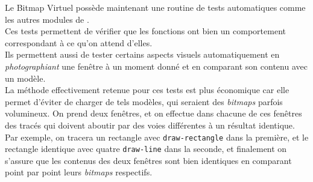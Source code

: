 

Le Bitmap Virtuel poss\`{e}de maintenant une routine de tests automatiques comme
les autres modules de \LeLisp.\\
Ces tests permettent de v\'{e}rifier que les fonctions ont bien un comportement
correspondant \`{a}  ce qu'on attend d'elles.\\
Ils permettent aussi de tester certains aspects visuels automatiquement en
{\em photographiant} une fen\^{e}tre \`{a} un moment donn\'{e} et en comparant son
contenu avec un mod\`{e}le.\\
La m\'{e}thode effectivement retenue pour ces tests est plus \'{e}conomique car elle
permet d'\'{e}viter de charger de tels mod\`{e}les, qui seraient des {\em bitmaps}
parfois volumineux.
On prend deux fen\^{e}tres, et on effectue dans chacune de ces
fen\^{e}tres des trac\'{e}s qui doivent aboutir par des voies diff\'{e}rentes \`{a} un
r\'{e}sultat identique.\\
Par exemple, on tracera un rectangle avec {\tt draw-rectangle} dans la
premi\`{e}re, et le rectangle identique avec quatre {\tt draw-line} dans la
seconde, et finalement on s'assure que les contenus des deux fen\^{e}tres sont
bien identiques en comparant point par point leurs {\em bitmaps} respectifs.\\


